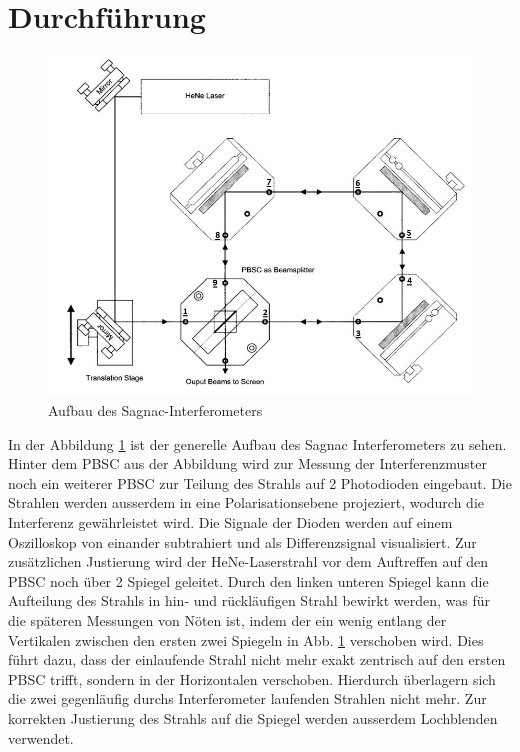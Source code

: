 	\section{Durchführung}
  \begin{figure}[H]
    \center
    \includegraphics[width=\textwidth]{./plots/Versuchsaufbau.JPG}
    \caption{Aufbau des Sagnac-Interferometers\cite{Anleitung}}
		\label{aufbau}
	\end{figure}
 In der Abbildung \ref{aufbau} ist der generelle Aufbau des Sagnac Interferometers zu sehen. Hinter dem PBSC aus der Abbildung wird
  zur Messung der Interferenzmuster noch ein weiterer PBSC zur Teilung des Strahls auf 2 Photodioden eingebaut. Die Strahlen werden ausserdem in eine Polarisationsebene projeziert, wodurch die Interferenz gewährleistet wird.
	Die Signale der Dioden werden auf einem Oszilloskop von einander subtrahiert und als Differenzsignal visualisiert.
  Zur zusätzlichen Justierung wird der HeNe-Laserstrahl vor dem Auftreffen auf den PBSC noch über 2 Spiegel geleitet. Durch den linken unteren Spiegel kann die Aufteilung des Strahls in hin- und rückläufigen
  Strahl bewirkt werden, was für die späteren Messungen von Nöten ist, indem der ein wenig entlang der Vertikalen zwischen den ersten zwei Spiegeln
	in Abb. \ref{aufbau} verschoben wird. Dies führt dazu, dass der einlaufende Strahl nicht mehr exakt zentrisch auf den ersten PBSC trifft, sondern in der Horizontalen verschoben. Hierdurch überlagern sich die zwei gegenläufig durchs Interferometer laufenden Strahlen nicht mehr. Zur korrekten Justierung des Strahls auf die Spiegel werden ausserdem Lochblenden verwendet.\\
